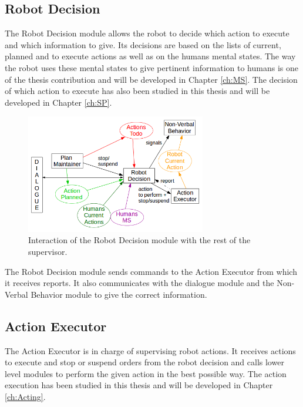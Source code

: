 \documentclass[english,a4paper,11pt,twoside]{StyleThese}
\begin{document}
\subsection{Robot Decision}

The Robot Decision module allows the robot to decide which action to execute and which information to give. Its decisions are based on the lists of current, planned and to execute actions as well as on the humans mental states. The way the robot uses these mental states to give pertinent information to humans is one of the thesis contribution and will be developed in Chapter \ref{ch:MS}. The decision of which action to execute has also been studied in this thesis and will be developed in Chapter \ref{ch:SP}.

\begin{figure}[h]
	\centering
    \includegraphics[width=0.7\textwidth]{figs/Chapter2/RobotDecision.png}
    \caption{Interaction of the Robot Decision module with the rest of the supervisor.}
    \label{fig:robotDecition}
\end{figure}

The Robot Decision module sends commands to the Action Executor from which it receives reports. It also communicates with the dialogue module and the Non-Verbal Behavior module to give the correct information.

\subsection{Action Executor}

The Action Executor is in charge of supervising robot actions. It receives actions to execute and stop or suspend orders from the robot decision and calls lower level modules to perform the given action in the best possible way. The action execution has been studied in this thesis and will be developed in Chapter \ref{ch:Acting}.
\end{document}
